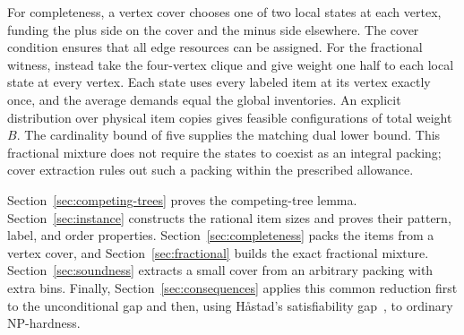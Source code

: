 For completeness, a vertex cover chooses one of two local states at each
vertex, funding the plus side on the cover and the minus side elsewhere.
The cover condition ensures that all edge resources can be assigned.
For the fractional witness, instead take the four-vertex clique and give
weight one half to each local state at every vertex. Each state uses
every labeled item at its vertex exactly once, and the average demands equal
the global inventories. An explicit distribution over physical item
copies gives feasible configurations of total weight $B$. The cardinality
bound of five supplies the matching dual lower bound. This fractional
mixture does not require the states to coexist as an integral packing;
cover extraction rules out such a packing within the prescribed allowance.

Section~\ref{sec:competing-trees} proves the competing-tree lemma.
Section~\ref{sec:instance} constructs the rational item sizes and proves
their pattern, label, and order properties.
Section~\ref{sec:completeness} packs the items from a vertex cover, and
Section~\ref{sec:fractional} builds the exact fractional mixture.
Section~\ref{sec:soundness} extracts a small cover from an arbitrary packing
with extra bins. Finally, Section~\ref{sec:consequences} applies this common
reduction first to the unconditional gap and then, using H\aa stad's
satisfiability gap~\cite{Hastad2001}, to ordinary NP-hardness.

